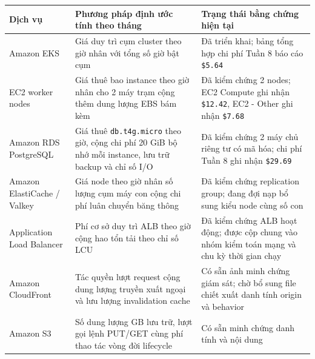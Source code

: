 {
\begingroup
\small
\setlength{\tabcolsep}{3pt}
\renewcommand{\arraystretch}{1.15}
\begin{longtable}{@{}
  >{\raggedright\arraybackslash}p{}
  >{\raggedright\arraybackslash}p{}
  >{\raggedright\arraybackslash}p{}@{}}
\toprule\noalign{}
\begin{minipage}[b]{\linewidth}\raggedright
Dịch vụ
\end{minipage} & \begin{minipage}[b]{\linewidth}\raggedright
Phương pháp định ước tính theo tháng
\end{minipage} & \begin{minipage}[b]{\linewidth}\raggedright
Trạng thái bằng chứng hiện tại
\end{minipage} \\
\midrule\noalign{}
\endhead
\bottomrule\noalign{}
\endlastfoot
Amazon EKS & Giá duy trì cụm cluster theo giờ nhân với tổng số giờ bật
cụm & Đã triển khai; bảng tổng hợp chi phí Tuần 8 báo cáo
\texttt{\$5.\allowbreak{}64} \\
EC2 worker nodes & Giá thuê bao instance theo giờ nhân cho 2 máy trạm
cộng thêm dung lượng EBS bám kèm & Đã kiểm chứng 2 nodes; EC2 Compute
ghi nhận \texttt{\$12.\allowbreak{}42}, EC2 - Other ghi nhận \texttt{\$7.\allowbreak{}68} \\
Amazon RDS PostgreSQL & Giá thuê \texttt{db.\allowbreak{}t4g.\allowbreak{}micro} theo giờ, cộng
chi phí 20 GiB bộ nhớ mỗi instance, lưu trữ backup và chỉ số I/O & Đã
kiểm chứng 2 máy chủ riêng tư có mã hóa; chi phí Tuần 8 ghi nhận
\texttt{\$29.\allowbreak{}69} \\
Amazon ElastiCache / Valkey & Giá node theo giờ nhân số lượng cụm máy
con cộng chi phí luân chuyển băng thông & Đã kiểm chứng replication
group; đang đợi nạp bổ sung kiểu node cùng số con \\
Application Load Balancer & Phí cơ sở duy trì ALB theo giờ cộng hao tổn
tải theo chỉ số LCU & Đã kiểm chứng ALB hoạt động; được cộp chung vào
nhóm kiểm toán mạng và chu kỳ thời gian chạy \\
Amazon CloudFront & Tác quyền lượt request cộng dung lượng truyền xuất
ngoại và lưu lượng invalidation cache & Có sẵn ảnh minh chứng giám sát;
chờ bổ sung file chiết xuất danh tính origin và behavior \\
Amazon S3 & Số dung lượng GB lưu trữ, lượt gọi lệnh PUT/GET cùng phí
thao tác vòng đời lifecycle & Có sẵn minh chứng danh tính và nội dung

\end{longtable}}
